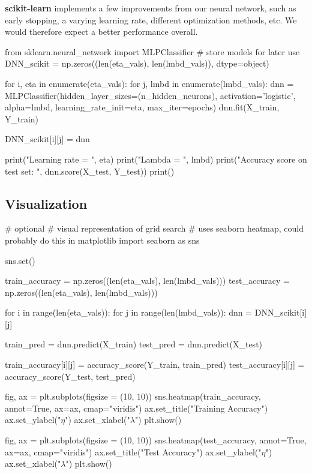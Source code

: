 \documentclass[%
oneside,                 %
final,                   %
10pt]{article}
\begin{document}
\textbf{scikit-learn} implements a few improvements from our neural network,
such as early stopping, a varying learning rate, different
optimization methods, etc. We would therefore expect a better
performance overall.

\bpycod
from sklearn.neural_network import MLPClassifier
# store models for later use
DNN_scikit = np.zeros((len(eta_vals), len(lmbd_vals)), dtype=object)

for i, eta in enumerate(eta_vals):
    for j, lmbd in enumerate(lmbd_vals):
        dnn = MLPClassifier(hidden_layer_sizes=(n_hidden_neurons), activation='logistic',
                            alpha=lmbd, learning_rate_init=eta, max_iter=epochs)
        dnn.fit(X_train, Y_train)
        
        DNN_scikit[i][j] = dnn
        
        print("Learning rate  = ", eta)
        print("Lambda = ", lmbd)
        print("Accuracy score on test set: ", dnn.score(X_test, Y_test))
        print()
\epycod


\subsection{Visualization}
\bpycod
# optional
# visual representation of grid search
# uses seaborn heatmap, could probably do this in matplotlib
import seaborn as sns

sns.set()

train_accuracy = np.zeros((len(eta_vals), len(lmbd_vals)))
test_accuracy = np.zeros((len(eta_vals), len(lmbd_vals)))

for i in range(len(eta_vals)):
    for j in range(len(lmbd_vals)):
        dnn = DNN_scikit[i][j]
        
        train_pred = dnn.predict(X_train) 
        test_pred = dnn.predict(X_test)

        train_accuracy[i][j] = accuracy_score(Y_train, train_pred)
        test_accuracy[i][j] = accuracy_score(Y_test, test_pred)

        
fig, ax = plt.subplots(figsize = (10, 10))
sns.heatmap(train_accuracy, annot=True, ax=ax, cmap="viridis")
ax.set_title("Training Accuracy")
ax.set_ylabel("$\eta$")
ax.set_xlabel("$\lambda$")
plt.show()

fig, ax = plt.subplots(figsize = (10, 10))
sns.heatmap(test_accuracy, annot=True, ax=ax, cmap="viridis")
ax.set_title("Test Accuracy")
ax.set_ylabel("$\eta$")
ax.set_xlabel("$\lambda$")
plt.show()
\epycod
\end{document}

